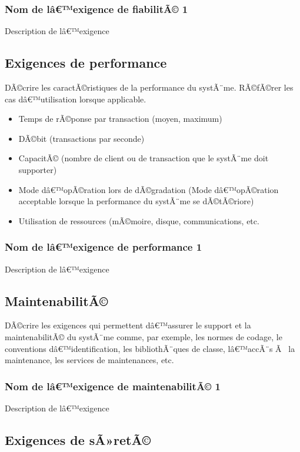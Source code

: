 \documentclass[a4paper, french, 10pt]{report}
\begin{document}
		\subsubsection{Nom de lâ€™exigence de fiabilitÃ© 1}
		Description de lâ€™exigence
		
	\subsection{Exigences de performance}
	DÃ©crire les caractÃ©ristiques de la performance du systÃ¨me. RÃ©fÃ©rer les cas dâ€™utilisation lorsque applicable.

	\begin{itemize}
	\item	Temps de rÃ©ponse par transaction (moyen, maximum)
	\item	DÃ©bit (transactions par seconde)
	\item	CapacitÃ© (nombre de client ou de transaction que le systÃ¨me doit supporter)
	\item	Mode dâ€™opÃ©ration lors de dÃ©gradation (Mode dâ€™opÃ©ration acceptable lorsque la performance du systÃ¨me se dÃ©tÃ©riore)
	\item	Utilisation de ressources (mÃ©moire, disque, communications, etc.
	\end{itemize}
	
	\subsubsection{Nom de lâ€™exigence de performance 1}
	Description de lâ€™exigence

	\subsection{MaintenabilitÃ©}
	
	DÃ©crire les exigences qui permettent dâ€™assurer le support et la maintenabilitÃ© du systÃ¨me comme, par exemple, les normes de codage, le conventions dâ€™identification, les bibliothÃ¨ques de classe, lâ€™accÃ¨s Ã  la maintenance, les services de maintenances, etc. 

	\subsubsection{Nom de lâ€™exigence de maintenabilitÃ© 1}
	Description de lâ€™exigence

	\subsection{Exigences de sÃ»retÃ©}
\end{document}
